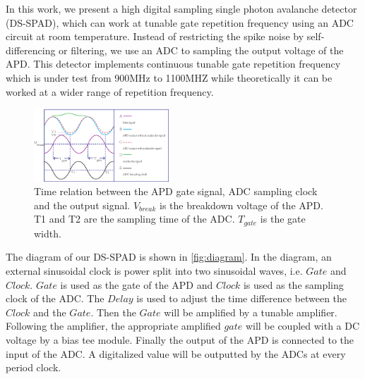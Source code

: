 \documentclass[%
 reprint,
superscriptaddress,
 amsmath,amssymb,
 aps,
]{revtex4-1}
\begin{document}
In this work, we present a high digital sampling single photon avalanche detector (DS-SPAD), which can work at tunable gate repetition frequency using an ADC circuit at room temperature. Instead of restricting the spike noise by self-differencing or filtering, we %
use an ADC to sampling the output voltage of the APD. %
This detector implements continuous tunable gate repetition frequency which is under test from 900MHz to 1100MHZ while theoretically it can be worked at a wider range of repetition frequency.

\begin{figure}
\centering
\includegraphics[width = 0.45\textwidth]{adc1.eps}
\vskip -0.1in
\caption{\label{fig:timing} Time relation between the APD gate signal, ADC sampling clock and the output signal. $V_{break}$ is the breakdown voltage of the APD. T1 and T2 are the sampling time of the ADC. $T_{gate}$ is the gate width.}
\vskip -0.2in
\end{figure}

The diagram of our DS-SPAD is shown in \autoref{fig:diagram}. In the diagram, an external sinusoidal clock is power split into two sinusoidal waves, i.e. $Gate$ and $Clock$. $Gate$ is used as the gate of the APD and $Clock$ is used as the sampling clock of the ADC. %
The ${Delay}$ is used to adjust the time difference between the $Clock$ and the $Gate$. Then the $Gate$ will be amplified by a tunable amplifier. Following the amplifier, the appropriate amplified $gate$ will be coupled with a DC voltage by a bias tee module. Finally the output of the APD is connected to the input of the ADC. A digitalized value will be outputted by the ADCs at every period clock.

\end{document}
